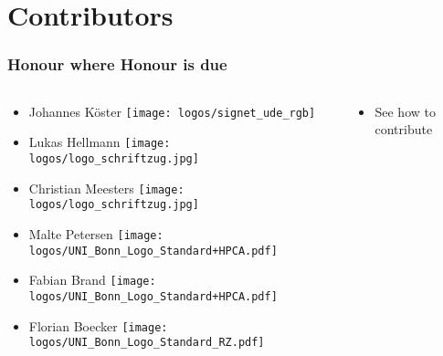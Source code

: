 \section{Contributors}

\begin{frame}
  \frametitle{Honour where Honour is due}
  \begin{columns}
  	\begin{column}{.5\textwidth}
  	   \begin{itemize}
  	   	\item Johannes Köster \texttt{[image: logos/signet\_ude\_rgb]}
  	   	\item Lukas Hellmann \texttt{[image: logos/logo\_schriftzug.jpg]}
  	   	\item Christian Meesters \texttt{[image: logos/logo\_schriftzug.jpg]}
  	   	\item Malte Petersen \texttt{[image: logos/UNI\_Bonn\_Logo\_Standard+HPCA.pdf]}
  	   	\item Fabian Brand \texttt{[image: logos/UNI\_Bonn\_Logo\_Standard+HPCA.pdf]}
  	   	\item Florian Boecker \texttt{[image: logos/UNI\_Bonn\_Logo\_Standard\_RZ.pdf]}
  	   \end{itemize}	
  	\end{column}
    \begin{column}{.5\textwidth}
    	\begin{itemize}
    		\item See how to contribute 
    	\end{itemize}	
    \end{column}
  \end{columns}
		
\end{frame}

